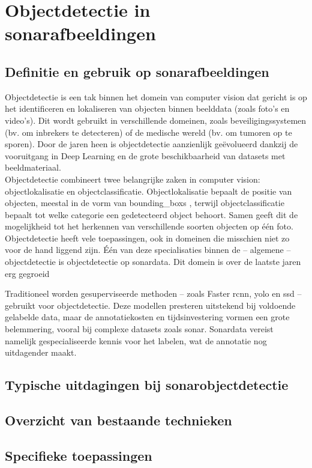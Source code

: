 \section{Objectdetectie in sonarafbeeldingen}

\subsection{Definitie en gebruik op sonarafbeeldingen}

Objectdetectie is een tak binnen het domein van computer vision dat gericht is op het identificeren en lokaliseren van objecten binnen beelddata (zoals foto's en video's). Dit wordt gebruikt in verschillende domeinen, zoals beveiligingssystemen (bv. om inbrekers te detecteren) of de medische wereld (bv. om tumoren op te sporen). Door de jaren heen is objectdetectie aanzienlijk geëvolueerd dankzij de vooruitgang in Deep Learning en de grote beschikbaarheid van datasets met beeldmateriaal. \autocite{He_2016} \\

Objectdetectie combineert twee belangrijke zaken in computer vision: objectlokalisatie en objectclassificatie. Objectlokalisatie bepaalt de positie van objecten, meestal in de vorm van \glspl{bounding_box} \autocite{Tompson_2015}, terwijl objectclassificatie bepaalt tot welke categorie een gedetecteerd object behoort. Samen geeft dit de mogelijkheid tot het herkennen van verschillende soorten objecten op één foto. \\

Objectdetectie heeft vele toepassingen, ook in domeinen die misschien niet zo voor de hand liggend zijn. Één van deze specialisaties binnen de -- algemene -- objectdetectie is objectdetectie op sonardata. Dit domein is over de laatste jaren erg gegroeid \autocite{Wang_2024}

Traditioneel worden gesuperviseerde methoden -- zoals Faster \gls{rcnn}, \gls{yolo} en \gls{ssd} -- gebruikt voor objectdetectie. \autocite{Redmon_2016} Deze modellen presteren uitstekend bij voldoende gelabelde data, maar de annotatiekosten en tijdsinvestering vormen een grote belemmering, vooral bij complexe datasets zoals sonar. Sonardata vereist namelijk gespecialiseerde kennis voor het labelen, wat de annotatie nog uitdagender maakt. \autocite{Long_2015} \\

\subsection{Typische uitdagingen bij sonarobjectdetectie}

\lipsum[1-3]

\subsection{Overzicht van bestaande technieken}

\lipsum[1-3]

\subsection{Specifieke toepassingen}

\lipsum[1-3]